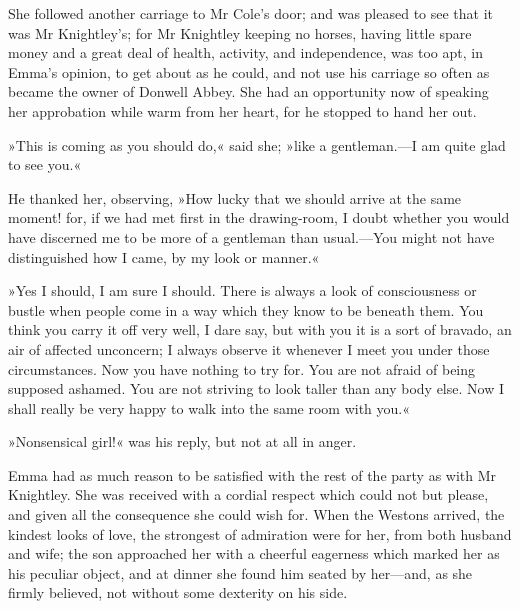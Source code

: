 She followed another carriage to Mr Cole's door; and was pleased to see that it was Mr Knightley's; for Mr Knightley keeping no horses, having little spare money and a great deal of health, activity, and independence, was too apt, in Emma's opinion, to get about as he could, and not use his carriage so often as became the owner of Donwell Abbey. She had an opportunity now of speaking her approbation while warm from her heart, for he stopped to hand her out.

»This is coming as you should do,« said she; »like a gentleman.—I am quite glad to see you.«

He thanked her, observing, »How lucky that we should arrive at the same moment! for, if we had met first in the drawing-room, I doubt whether you would have discerned me to be more of a gentleman than usual.—You might not have distinguished how I came, by my look or manner.«

»Yes I should, I am sure I should. There is always a look of consciousness or bustle when people come in a way which they know to be beneath them. You think you carry it off very well, I dare say, but with you it is a sort of bravado, an air of affected unconcern; I always observe it whenever I meet you under those circumstances. Now you have nothing to try for. You are not afraid of being supposed ashamed. You are not striving to look taller than any body else. Now I shall really be very happy to walk into the same room with you.«

»Nonsensical girl!« was his reply, but not at all in anger.

Emma had as much reason to be satisfied with the rest of the party as with Mr Knightley. She was received with a cordial respect which could not but please, and given all the consequence she could wish for. When the Westons arrived, the kindest looks of love, the strongest of admiration were for her, from both husband and wife; the son approached her with a cheerful eagerness which marked her as his peculiar object, and at dinner she found him seated by her—and, as she firmly believed, not without some dexterity on his side.

